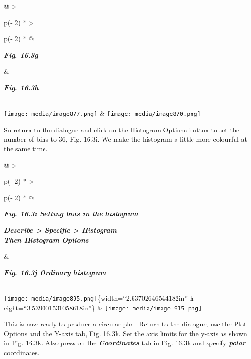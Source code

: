 \documentclass[
  letterpaper,
  DIV=11,
  numbers=noendperiod]{scrreprt}
\begin{document}
\begin{longtable}[]{@{}
  >{\raggedright\arraybackslash}p{(\columnwidth - 2\tabcolsep) * }
  >{\raggedright\arraybackslash}p{(\columnwidth - 2\tabcolsep) * }@{}}
\toprule\noalign{}
\begin{minipage}[b]{\linewidth}\raggedright
\textbf{\emph{Fig. 16.3g}}
\end{minipage} & \begin{minipage}[b]{\linewidth}\raggedright
\textbf{\emph{Fig. 16.3h}}
\end{minipage} \\
\midrule\noalign{}
\endhead
\bottomrule\noalign{}
\endlastfoot
\texttt{[image: media/image877.png]} &
\texttt{[image: media/image870.png]} \\
\end{longtable}

So return to the dialogue and click on the Histogram Options button to
set the number of bins to 36, Fig. 16.3i. We make the histogram a little
more colourful at the same time.

\begin{longtable}[]{@{}
  >{\raggedright\arraybackslash}p{(\columnwidth - 2\tabcolsep) * }
  >{\raggedright\arraybackslash}p{(\columnwidth - 2\tabcolsep) * }@{}}
\toprule\noalign{}
\begin{minipage}[b]{\linewidth}\raggedright
\textbf{\emph{Fig. 16.3i Setting bins in the histogram}}

\textbf{\emph{Describe \textgreater{} Specific \textgreater{}
Histogram\\
Then Histogram Options}}\strut
\end{minipage} & \begin{minipage}[b]{\linewidth}\raggedright
\textbf{\emph{Fig. 16.3j Ordinary histogram}}
\end{minipage} \\
\midrule\noalign{}
\endhead
\bottomrule\noalign{}
\endlastfoot
\texttt{[image: media/image895.png]}\{width=``2.63702646544182in'' h
eight=``3.539001531058618in''\} &
\texttt{[image: media/image 915.png]} \\
\end{longtable}

This is now ready to produce a circular plot. Return to the dialogue,
use the Plot Options and the Y-axis tab, Fig. 16.3k. Set the axis limits
for the y-axis as shown in Fig. 16.3k. Also press on the
\textbf{\emph{Coordinates}} tab in Fig. 16.3k and specify
\textbf{\emph{polar}} coordinates.
\end{document}
